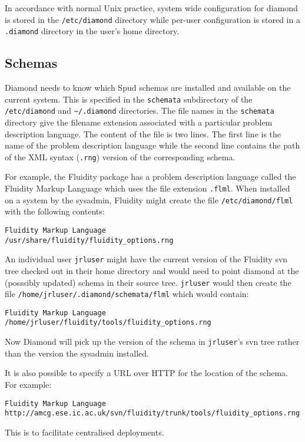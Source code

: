 \documentclass[a4paper, 11pt]{book}
\begin{document}
In accordance with normal Unix practice, system wide configuration for
diamond is stored in the \verb+/etc/diamond+ directory while per-user
configuration is stored in a \verb+.diamond+ directory in the user's home
directory.

\subsection{Schemas}

Diamond needs to know which Spud schemas are installed and available on the
current system. This is specified in the \verb+schemata+ subdirectory of the
\verb+/etc/diamond+ and \verb+~/.diamond+ directories. The file names in the
\verb+schemata+ directory give the filename extension associated with a
particular problem description language. The content of the file is two
lines. The first line is the name of the problem description language while
the second line contains the path of the XML syntax (\verb+.rng+) version of
the corresponding schema.

For example, the Fluidity package has a problem description language called
the Fluidity Markup Language which uses the file extension
\verb+.flml+. When installed on a system by the sysadmin, Fluidity might
create the file \verb+/etc/diamond/flml+ with the following contents:
\begin{verbatim}
Fluidity Markup Language
/usr/share/fluidity/fluidity_options.rng
\end{verbatim}
An individual user \verb+jrluser+ might have the current version of the
Fluidity svn tree checked out in their home directory and would need to
point diamond at the (posssibly updated) schema in their source
tree. \verb+jrluser+ would then create the file
\verb+/home/jrluser/.diamond/schemata/flml+ which would contain:
\begin{verbatim}
Fluidity Markup Language
/home/jrluser/fluidity/tools/fluidity_options.rng
\end{verbatim}
Now Diamond will pick up the version of the schema in \verb+jrluser+'s svn
tree rather than the version the sysadmin installed.

It is also possible to specify a URL over HTTP for the location of the
schema. For example:
\begin{verbatim}
Fluidity Markup Language
http://amcg.ese.ic.ac.uk/svn/fluidity/trunk/tools/fluidity_options.rng
\end{verbatim}
This is to facilitate centralised deployments.
\end{document}
